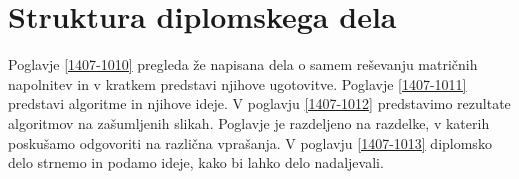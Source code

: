 \section{Struktura diplomskega dela}

Poglavje \ref{1407-1010} pregleda že napisana dela o samem reševanju matričnih napolnitev in v kratkem predstavi njihove ugotovitve. Poglavje \ref{1407-1011} predstavi algoritme in njihove ideje. V poglavju \ref{1407-1012} predstavimo rezultate algoritmov na zašumljenih slikah. Poglavje je razdeljeno na razdelke, v katerih poskušamo odgovoriti na različna vprašanja. V poglavju \ref{1407-1013} diplomsko delo strnemo in podamo ideje, kako bi lahko delo nadaljevali.